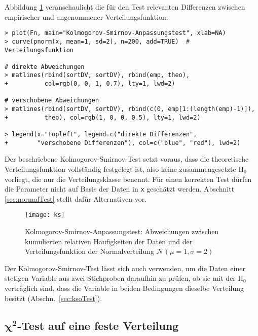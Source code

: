 Abbildung \ref{fig:ks} veranschaulicht die für den Test relevanten Differenzen zwischen empirischer und angenommener Verteilungsfunktion.
\begin{lstlisting}
> plot(Fn, main="Kolmogorov-Smirnov-Anpassungstest", xlab=NA)
> curve(pnorm(x, mean=1, sd=2), n=200, add=TRUE)  # Verteilungsfunktion

# direkte Abweichungen
> matlines(rbind(sortDV, sortDV), rbind(emp, theo),
+          col=rgb(0, 0, 1, 0.7), lty=1, lwd=2)

# verschobene Abweichungen
> matlines(rbind(sortDV, sortDV), rbind(c(0, emp[1:(length(emp)-1)]),
+          theo), col=rgb(1, 0, 0, 0.5), lty=1, lwd=2)

> legend(x="topleft", legend=c("direkte Differenzen",
+        "verschobene Differenzen"), col=c("blue", "red"), lwd=2)
\end{lstlisting}

Der beschriebene Kolmogorov-Smirnov-Test setzt voraus, dass die theoretische Verteilungsfunktion vollständig festgelegt ist, also keine zusammengesetzte $\text{H}_{0}$ vorliegt, die nur die Verteilungsklasse benennt. Für einen korrekten Test dürfen die Parameter nicht auf Basis der Daten in \lstinline!x! geschätzt werden. Abschnitt \ref{sec:normalTest} stellt dafür Alternativen vor.

\begin{figure}[ht]
\centering
\texttt{[image: ks]}
\vspace*{-1.5em}
\caption{Kolmogorov-Smirnov-Anpassungstest: Abweichungen zwischen kumulierten relativen Häufigkeiten der Daten und der Verteilungsfunktion der Normalverteilung $\mathcal{N}(\mu=1, \sigma=2)$}
\label{fig:ks}
\end{figure}

Der Kolmogorov-Smirnov-Test lässt sich auch verwenden, um die Daten einer stetigen Variable aus zwei Stichproben daraufhin zu prüfen, ob sie mit der $\text{H}_{0}$ verträglich sind, dass die Variable in beiden Bedingungen dieselbe Verteilung besitzt (Abschn.\ \ref{sec:ksoTest}).

\subsection[\texorpdfstring{$\chi^{2}$}{chi2}-Test auf eine feste Verteilung]{$\bm{\chi^{2}}$-Test auf eine feste Verteilung}

